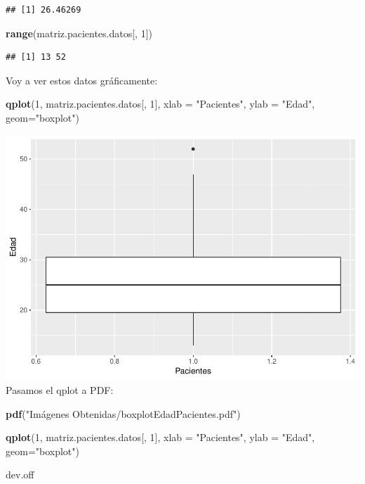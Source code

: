 \documentclass[]{article}
\newenvironment{Shaded}{\begin{snugshade}}{\end{snugshade}}
\newcommand{\KeywordTok}[1]{\textcolor[rgb]{0.13,0.29,0.53}{\textbf{#1}}}
\newcommand{\DataTypeTok}[1]{\textcolor[rgb]{0.13,0.29,0.53}{#1}}
\newcommand{\DecValTok}[1]{\textcolor[rgb]{0.00,0.00,0.81}{#1}}
\newcommand{\StringTok}[1]{\textcolor[rgb]{0.31,0.60,0.02}{#1}}
\newcommand{\NormalTok}[1]{#1}
\begin{document}
\begin{verbatim}
## [1] 26.46269
\end{verbatim}

\begin{Shaded}
\begin{Highlighting}[]
\KeywordTok{range}\NormalTok{(matriz.pacientes.datos[, }\DecValTok{1}\NormalTok{])}
\end{Highlighting}
\end{Shaded}

\begin{verbatim}
## [1] 13 52
\end{verbatim}

Voy a ver estos datos gráficamente:

\begin{Shaded}
\begin{Highlighting}[]
\KeywordTok{qplot}\NormalTok{(}\DecValTok{1}\NormalTok{, matriz.pacientes.datos[, }\DecValTok{1}\NormalTok{], }\DataTypeTok{xlab =} \StringTok{"Pacientes"}\NormalTok{, }\DataTypeTok{ylab =} \StringTok{"Edad"}\NormalTok{, }\DataTypeTok{geom=}\StringTok{"boxplot"}\NormalTok{)}
\end{Highlighting}
\end{Shaded}

\includegraphics{codigo_files/figure-latex/grafico_estadistica_edad-1.pdf}
Pasamos el qplot a PDF:

\begin{Shaded}
\begin{Highlighting}[]
\KeywordTok{pdf}\NormalTok{(}\StringTok{"Imágenes Obtenidas/boxplotEdadPacientes.pdf"}\NormalTok{)}

\KeywordTok{qplot}\NormalTok{(}\DecValTok{1}\NormalTok{, matriz.pacientes.datos[, }\DecValTok{1}\NormalTok{], }\DataTypeTok{xlab =} \StringTok{"Pacientes"}\NormalTok{, }\DataTypeTok{ylab =} \StringTok{"Edad"}\NormalTok{, }\DataTypeTok{geom=}\StringTok{"boxplot"}\NormalTok{)}

\NormalTok{dev.off}
\end{Highlighting}
\end{Shaded}
\end{document}
